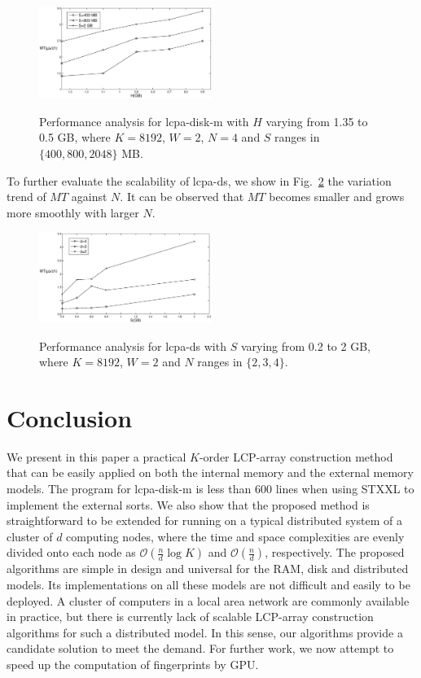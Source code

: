 \documentclass[10pt,journal,compsoc]{IEEEtran}
\begin{document}
\begin{CJK*}{GBK}{song}
\begin{figure}[hbtp!]
  \centering
  \includegraphics[width=0.5\textwidth]{stxxl_pq_impact.eps}\\
  \caption{Performance analysis for lcpa-disk-m with $H$ varying from 1.35 to 0.5 GB, where $K=8192$, $W=2$, $N=4$ and $S$ ranges in $\{400, 800, 2048\}$ MB.}
  \label{fig:stxxl_pq_impact}
\end{figure}

To further evaluate the scalability of lcpa-ds, we show in Fig.~\ref{fig:ds_varying_n} the variation trend of $MT$ against $N$. It can be observed that $MT$ becomes smaller and grows more smoothly with larger $N$.

\begin{figure}[hbtp!]
  \centering
  \includegraphics[width=0.5\textwidth]{ds_varying_n.eps}\\
  \caption{Performance analysis for lcpa-ds with $S$ varying from 0.2 to 2 GB, where $K=8192$, $W=2$ and $N$ ranges in $\{2,3,4\}$.}
  \label{fig:ds_varying_n}
\end{figure}


\section{Conclusion}\label{sec:conclusion}

We present in this paper a practical $K$-order LCP-array construction method that can be easily applied on both the internal memory and the external memory models. The program for lcpa-disk-m is less than 600 lines when using STXXL to implement the external sorts. We also show that the proposed method is straightforward to be extended for running on a typical distributed system of a cluster of $d$ computing nodes, where the time and space complexities are evenly divided onto each node as $\mathcal{O}(\frac{n}{d}\log K)$ and $\mathcal{O}(\frac{n}{d})$, respectively. The proposed algorithms are simple in design and universal for the RAM, disk and distributed models. Its implementations on all these models are not difficult and easily to be deployed.
A cluster of computers in a local area network are commonly available in practice, but there is currently lack of scalable LCP-array construction algorithms for such a distributed model. In this sense, our algorithms provide a candidate solution to meet the demand. For further work, we now attempt to speed up the computation of fingerprints by GPU.




\end{CJK*}
\end{document}
